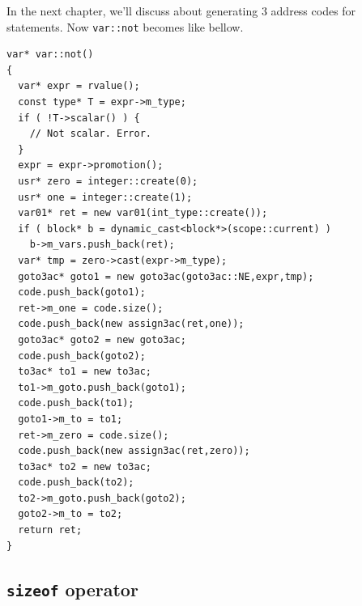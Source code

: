 In the next chapter, we'll discuss about generating 3 address codes
for statements. Now {\tt{var::not}} becomes like bellow.
\begin{verbatim}
var* var::not()
{
  var* expr = rvalue();
  const type* T = expr->m_type;
  if ( !T->scalar() ) {
    // Not scalar. Error.
  }
  expr = expr->promotion();
  usr* zero = integer::create(0);
  usr* one = integer::create(1);
  var01* ret = new var01(int_type::create());
  if ( block* b = dynamic_cast<block*>(scope::current) )
    b->m_vars.push_back(ret);
  var* tmp = zero->cast(expr->m_type);
  goto3ac* goto1 = new goto3ac(goto3ac::NE,expr,tmp);
  code.push_back(goto1);
  ret->m_one = code.size();
  code.push_back(new assign3ac(ret,one));
  goto3ac* goto2 = new goto3ac;
  code.push_back(goto2);
  to3ac* to1 = new to3ac;
  to1->m_goto.push_back(goto1);
  code.push_back(to1);
  goto1->m_to = to1;
  ret->m_zero = code.size();
  code.push_back(new assign3ac(ret,zero));
  to3ac* to2 = new to3ac;
  code.push_back(to2);
  to2->m_goto.push_back(goto2);
  goto2->m_to = to2;
  return ret;
}
\end{verbatim}

\subsection{{\tt{sizeof}} operator}

